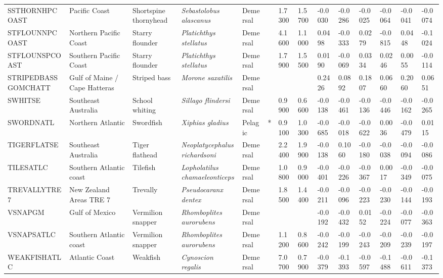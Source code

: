 \begin{longtable}{p{2.8cm}p{2cm}p{1.7cm}p{1.7cm}p{1cm}p{0.3cm}p{1cm}p{1cm}p{1cm}p{1cm}p{1cm}p{1cm}p{1cm}p{1cm}}
  SSTHORNHPCOAST & Pacific Coast & Shortspine thornyhead & \textit{Sebastolobus alascanus} & Demersal &   & 1.7300 & 1.5700 & -0.0030 & -0.0286 & -0.0025 & -0.0064 & -0.0041 & -0.0074 \\ 
  STFLOUNNPCOAST & Northern Pacific Coast & Starry flounder & \textit{Platichthys stellatus} & Demersal &   & 4.1600 & 1.1000 & 0.0498 & -0.0333 & 0.0279 & -0.0815 & 0.0448 & -0.1024 \\ 
  STFLOUNSPCOAST & Southern Pacific Coast & Starry flounder & \textit{Platichthys stellatus} & Demersal &   & 1.7900 & 1.5500 & 0.0190 & -0.0069 & 0.0334 & 0.0246 & 0.0055 & -0.0114 \\ 
  STRIPEDBASSGOMCHATT & Gulf of Maine / Cape Hatteras & Striped bass & \textit{Morone saxatilis} & Demersal &  &  &  & 0.2426 & 0.0892 & 0.1807 & 0.0660 & 0.2060 & 0.0651 \\ 
  SWHITSE & Southeast Australia & School whiting & \textit{Sillago flindersi} & Demersal &   & 0.9900 & 0.6600 & -0.0138 & -0.0461 & -0.0136 & -0.0446 & -0.0162 & -0.0265 \\ 
  SWORDNATL & Northern Atlantic & Swordfish & \textit{Xiphias gladius} & Pelagic & * & 0.9100 & 1.0300 & -0.0685 & -0.0018 & -0.0622 & 0.0036 & -0.0479 & 0.0115 \\ 
  TIGERFLATSE & Southeast Australia & Tiger flathead & \textit{Neoplatycephalus richardsoni} & Demersal &   & 2.2400 & 1.9900 & -0.0138 & 0.1060 & -0.0180 & -0.0038 & -0.0094 & -0.0086 \\ 
  TILESATLC & Southern Atlantic coast & Tilefish & \textit{Lopholatilus chamaeleonticeps} & Demersal &   & 1.0800 & 0.9000 & -0.0401 & -0.0226 & -0.0367 & 0.0017 & -0.0349 & -0.0075 \\ 
  TREVALLYTRE7 & New Zealand Areas TRE 7 & Trevally & \textit{Pseudocaranx dentex} & Demersal &   & 1.8500 & 1.4400 & -0.0211 & -0.0096 & -0.0223 & -0.0230 & -0.0144 & -0.0193 \\ 
  VSNAPGM & Gulf of Mexico & Vermilion snapper & \textit{Rhomboplites aurorubens} & Demersal &  &  &  & -0.0192 & -0.0432 & 0.0152 & -0.0224 & -0.0077 & -0.0363 \\ 
  VSNAPSATLC & Southern Atlantic coast & Vermilion snapper & \textit{Rhomboplites aurorubens} & Demersal &   & 1.1200 & 0.8600 & -0.0242 & -0.0199 & -0.0243 & -0.0209 & -0.0239 & -0.0197 \\ 
  WEAKFISHATLC & Atlantic Coast & Weakfish & \textit{Cynoscion regalis} & Demersal &   & 7.0700 & 0.7900 & -0.0379 & -0.1393 & -0.0597 & -0.1488 & -0.0611 & -0.1373 \\ 

\end{longtable}
